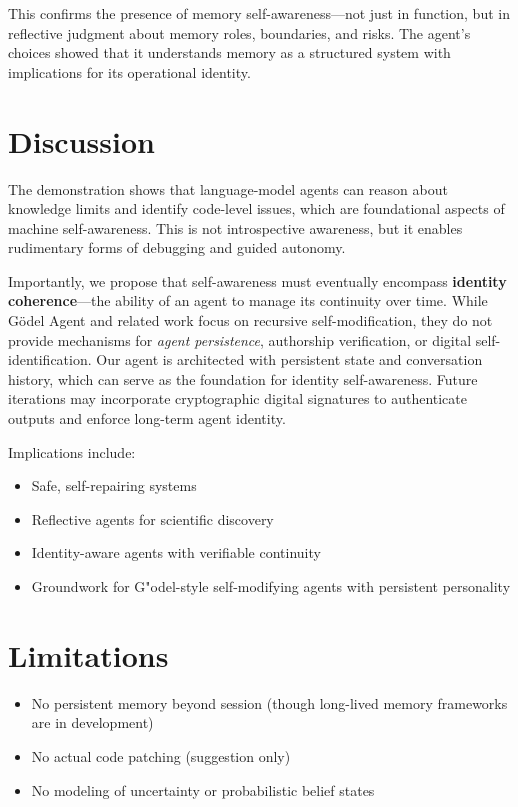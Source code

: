 \documentclass[11pt]{article}
\begin{document}
This confirms the presence of memory self-awareness—not just in function, but in reflective judgment about memory roles, boundaries, and risks. The agent’s choices showed that it understands memory as a structured system with implications for its operational identity.
\section{Discussion}
The demonstration shows that language-model agents can reason about knowledge limits and identify code-level issues, which are foundational aspects of machine self-awareness. This is not introspective awareness, but it enables rudimentary forms of debugging and guided autonomy.

Importantly, we propose that self-awareness must eventually encompass \textbf{identity coherence}—the ability of an agent to manage its continuity over time. While Gödel Agent and related work focus on recursive self-modification, they do not provide mechanisms for \textit{agent persistence}, authorship verification, or digital self-identification. Our agent is architected with persistent state and conversation history, which can serve as the foundation for identity self-awareness. Future iterations may incorporate cryptographic digital signatures to authenticate outputs and enforce long-term agent identity.

Implications include:
\begin{itemize}
    \item Safe, self-repairing systems
    \item Reflective agents for scientific discovery
    \item Identity-aware agents with verifiable continuity
    \item Groundwork for G"odel-style self-modifying agents with persistent personality
\end{itemize}

\section{Limitations}
\begin{itemize}
    \item No persistent memory beyond session (though long-lived memory frameworks are in development)
    \item No actual code patching (suggestion only)
    \item No modeling of uncertainty or probabilistic belief states
\end{itemize}
\end{document}
